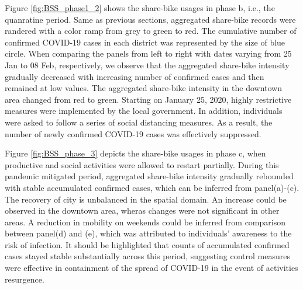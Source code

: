 \documentclass[preprints,ijgi,submit,moreauthors]{Definitions/mdpi}
\begin{document}
Figure \ref{fig:BSS_phase1_2} shows the share-bike usages in phase b, i.e., the quanratine period.
Same as previous sections, aggregated share-bike records were randered with a color ramp from grey to green to red.
The cumulative number of confirmed COVID-19 cases in each district was represented by the size of blue circle.
When comparing the panels from left to right with dates varying from 25 Jan to 08 Feb, respectively, we observe that the aggregated share-bike intensity gradually decreased with increasing number of confirmed cases and then remained at low values.
The aggregated share-bike intensity in the downtown area changed from red to green.
Starting on January 25, 2020, highly restrictive measures were implemented by the local government.
In addition, individuals were asked to follow a series of social distancing measures.
As a result, the number of newly confirmed COVID-19 cases was effectively suppressed.

Figure \ref{fig:BSS_phase_3} depicts the share-bike usages in phase c, when productive and social activities were allowed to restart partially.
During this pandemic mitigated period, aggregated share-bike intensity gradually rebounded with stable accumulated confirmed cases, which can be inferred from panel(a)-(c).
The recovery of city is unbalanced in the spatial domain.
An increase could be observed in the downtown area, wheras changes were not significant in other areas.
A reduction in mobility on weekends could be inferred from comparison between panel(d) and (e), which was attributed to individuals' awareness to the risk of infection.
It should be highlighted that counts of accumulated confirmed cases stayed stable substantially across this period, suggesting control measures were effective in containment of the spread of COVID-19 in the event of activities resurgence.  
\end{document}
